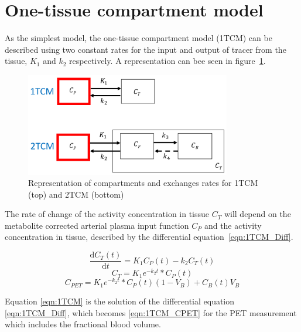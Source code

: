 \section{One-tissue compartment model}
As the simplest model, the one-tissue compartment model (1TCM) can be described using two constant rates for the input and output of tracer from the tissue, $K_1$ and $k_2$ respectively. A representation can bee seen in figure~\ref{fig:1_2TCM}.

\begin{figure}[ht]
	\includegraphics[width=0.8\textwidth]{2_Theory_Methods/figures/TissueCompartmentModels.pdf}
	\centering
	\caption{Representation of compartments and exchanges rates for 1TCM (top) and 2TCM (bottom)}
	\centering
	\label{fig:1_2TCM}
\end{figure}

The rate of change of the activity concentration in tissue $C_T$ will depend on the metabolite corrected arterial plasma input function $C_P$ and the activity concentration in tissue, described by the differential equation~\ref{eqn:1TCM_Diff}.

\begin{equation}
  \frac{\mathrm d C_T(t)}{\mathrm d t} = K_1 C_P(t) - k_2 C_T(t)
  \label{eqn:1TCM_Diff}
\end{equation}
\begin{equation}
   C_T = K_1 e^{-k_2 t} \ast C_P(t) 
  \label{eqn:1TCM}
\end{equation}
\begin{equation}
   C_{PET} =   K_1 e^{-k_2 t} \ast C_P(t) (1-V_B) + C_B(t) V_B
  \label{eqn:1TCM_CPET}
\end{equation}

Equation \ref{eqn:1TCM} is the solution of the differential equation \ref{eqn:1TCM_Diff}, which becomes \ref{eqn:1TCM_CPET} for the PET measurement which includes the fractional blood volume. %

